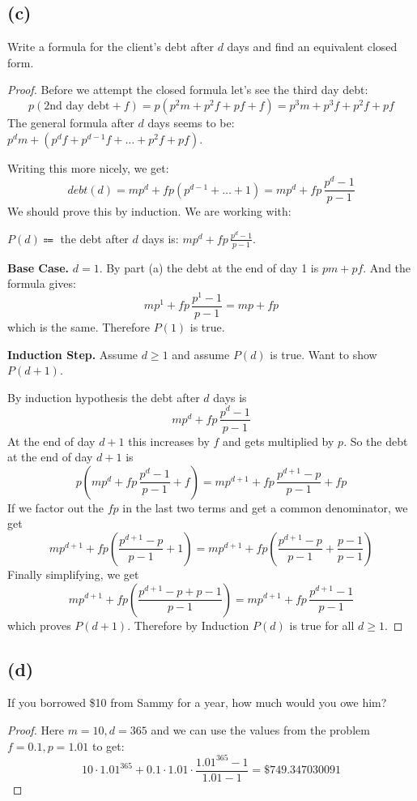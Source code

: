 \documentclass[14pt]{extarticle}
\newcommand{\dps}{\displaystyle}
\begin{document}
\subsection{(c)}
Write a formula for the client’s debt after $d$ days and find an equivalent closed form.
\begin{proof}
Before we attempt the closed formula let's see the third day debt:
$$
p(\text{2nd day debt} + f) = p(p^2m + p^2f + pf + f) = p^3m + p^3f + p^2f + pf
$$
The general formula after $d$ days seems to be: $p^dm + (p^df + p^{d-1}f + \ldots + p^2f + pf)$.

Writing this more nicely, we get:
$$
debt(d) = mp^d + fp(p^{d-1} + \ldots + 1) = mp^d + fp\,\frac{p^d-1}{p-1}
$$
We should prove this by induction. We are working with:
\begin{center}
$P(d) \Coloneqq$ the debt after $d$ days is: $\dps mp^d + fp\,\frac{p^d-1}{p-1}$.
\end{center}

{\bf Base Case.} $d = 1$. By part (a) the debt at the end of day 1 is $pm + pf$. And the formula gives:
$$
mp^1 + fp\,\frac{p^1-1}{p-1} = mp + fp
$$
which is the same. Therefore $P(1)$ is true.

{\bf Induction Step.} Assume $d \geq 1$ and assume $P(d)$ is true. Want to show $P(d+1)$.

By induction hypothesis the debt after $d$ days is
$$
mp^d + fp\,\frac{p^d-1}{p-1}
$$
At the end of day $d+1$ this increases by $f$ and gets multiplied by $p$. So the debt at the end of day $d+1$ is
$$
p(mp^d + fp\,\frac{p^d-1}{p-1} + f) = mp^{d+1} + fp\,\frac{p^{d+1}-p}{p-1} + fp
$$
If we factor out the $fp$ in the last two terms and get a common denominator, we get
$$
mp^{d+1} + fp(\frac{p^{d+1}-p}{p-1} + 1) = mp^{d+1} + fp(\frac{p^{d+1}-p}{p-1} + \frac{p-1}{p-1})
$$
Finally simplifying, we get
$$
mp^{d+1} + fp(\frac{p^{d+1}-p + p - 1}{p-1}) = mp^{d+1} + fp\,\frac{p^{d+1} - 1}{p-1}
$$
which proves $P(d+1)$. Therefore by Induction $P(d)$ is true for all $d \geq 1$.
\end{proof}

\subsection{(d)}
If you borrowed \$10 from Sammy for a year, how much would you owe him?
\begin{proof}
Here $m = 10, d = 365$ and we can use the values from the problem $f = 0.1, p = 1.01$ to get:
$$
10 \cdot 1.01^{365} + 0.1 \cdot 1.01 \cdot\frac{1.01^{365}-1}{1.01-1} = \$ 749.347030091
$$
\end{proof}
\end{document}
